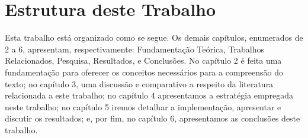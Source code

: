 




\section{Estrutura deste Trabalho}

Esta trabalho está organizado como se segue. Os demais capítulos, enumerados de 2 a 6, apresentam, respectivamente: Fundamentação Teórica, Trabalhos Relacionados, Pesquisa, Resultados, e Conclusões. No capítulo 2 é feita uma fundamentação para oferecer os conceitos necessários para a compreensão do texto; no capítulo 3, uma discussão e comparativo a respeito da literatura relacionada a este trabalho; no capítulo 4 apresentamos a estratégia empregada neste trabalho; no capítulo 5 iremos detalhar a implementação, apresentar e discutir os resultados; e, por fim, no capítulo 6, apresentamos as conclusões deste trabalho.
